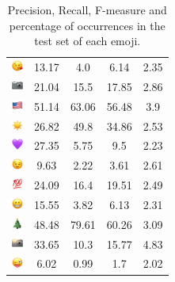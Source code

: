 \documentclass{article}
\begin{document}
\begin{table}
\begin{tabular}{|c|ccc|c|}
\includegraphics[height=0.37cm,width=0.37cm]{img/face_blowing_a_kiss.png} & 13.17 & 4.0 & 6.14 & 2.35\\ 
\includegraphics[height=0.37cm,width=0.37cm]{img/camera.png} & 21.04 & 15.5 & 17.85 & 2.86\\ 
\includegraphics[height=0.37cm,width=0.37cm]{img/United_States.png} & 51.14 & 63.06 & 56.48 & 3.9\\ 
\includegraphics[height=0.37cm,width=0.37cm]{img/sun.png} & 26.82 & 49.8 & 34.86 & 2.53\\ 
\includegraphics[height=0.37cm,width=0.37cm]{img/purple_heart.png} & 27.35 & 5.75 & 9.5 & 2.23\\ 
\includegraphics[height=0.37cm,width=0.37cm]{img/winking_face.png} & 9.63 & 2.22 & 3.61 & 2.61\\ 
\includegraphics[height=0.37cm,width=0.37cm]{img/hundred_points.png} & 24.09 & 16.4 & 19.51 & 2.49\\ 
\includegraphics[height=0.37cm,width=0.37cm]{img/beaming_face_with_smiling_eyes.png} & 15.55 & 3.82 & 6.13 & 2.31\\ 
\includegraphics[height=0.37cm,width=0.37cm]{img/Christmas_tree.png} & 48.48 & 79.61 & 60.26 & 3.09\\ 
\includegraphics[height=0.37cm,width=0.37cm]{img/camera_with_flash.png} & 33.65 & 10.3 & 15.77 & 4.83\\ 
\includegraphics[height=0.37cm,width=0.37cm]{img/winking_face_with_tongue.png} & 6.02 & 0.99 & 1.7 & 2.02\\ 

\hline
\end{tabular}
\caption{\label{table:emoji_detailed} Precision, Recall, F-measure and percentage of occurrences in the test set of each emoji.}
\end{table}
\end{document}
